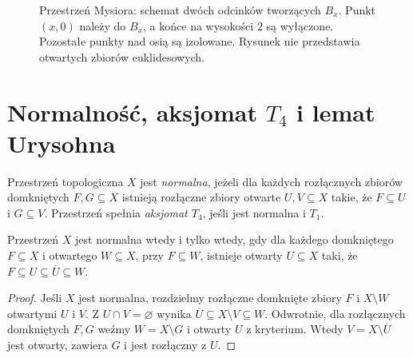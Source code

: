 \begin{figure}[htbp]
\centering
{}
\caption{Przestrzeń Mysiora: schemat dwóch odcinków tworzących
$B_x$. Punkt $(x,0)$ należy do $B_x$, a końce na wysokości $2$
są wyłączone. Pozostałe punkty nad osią są izolowane.
Rysunek nie przedstawia otwartych zbiorów euklidesowych.}
\label{fig:topog-mysior-baza}
\end{figure}

\section{Normalność, aksjomat $T_4$ i lemat Urysohna}
\label{sec:topog-normalnosc}

\begin{definicja}
\label{def:topog-normalnosc-t4}
Przestrzeń topologiczna $X$ jest \emph{normalna}, jeżeli
dla każdych rozłącznych zbiorów domkniętych $F,G\subseteq X$
istnieją rozłączne zbiory otwarte $U,V\subseteq X$
takie, że $F\subseteq U$ i $G\subseteq V$.
Przestrzeń spełnia \emph{aksjomat $T_4$}, jeśli jest
normalna i $T_1$.
\end{definicja}

\begin{stwierdzenie}
\label{prop:topog-normalnosc-zwezanie}
Przestrzeń $X$ jest normalna wtedy i tylko wtedy,
gdy dla każdego domkniętego $F\subseteq X$ i otwartego
$W\subseteq X$, przy $F\subseteq W$, istnieje otwarty
$U\subseteq X$ taki, że
$F\subseteq U\subseteq\overline U\subseteq W$.
\end{stwierdzenie}
\begin{proof}
Jeśli $X$ jest normalna, rozdzielmy rozłączne domknięte
zbiory $F$ i $X\setminus W$ otwartymi $U$ i $V$.
Z $U\cap V=\varnothing$ wynika
$\overline U\subseteq X\setminus V\subseteq W$.
Odwrotnie, dla rozłącznych domkniętych $F,G$ weźmy
$W=X\setminus G$ i otwarty $U$ z kryterium.
Wtedy $V=X\setminus\overline U$ jest otwarty, zawiera $G$
i jest rozłączny z $U$.
\end{proof}

